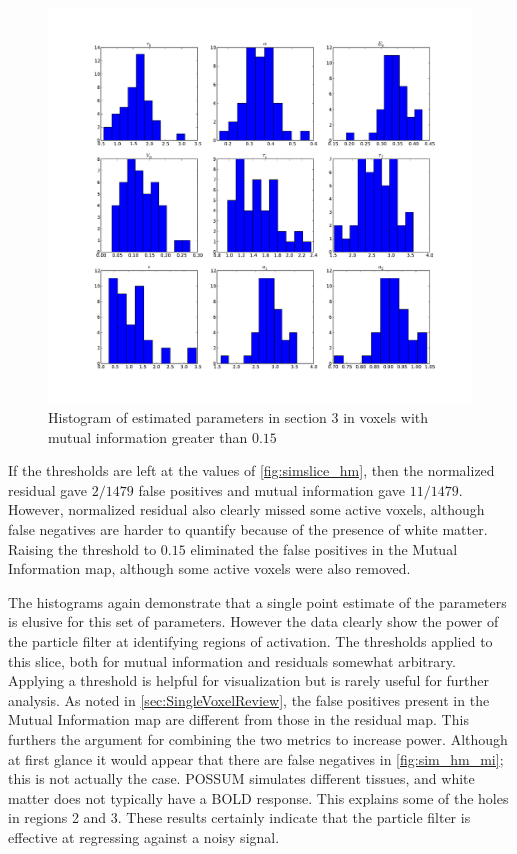 \begin{figure} %
\centering
\includegraphics[clip=true,trim=2.5cm 2cm 2cm 1cm,width=15cm]{images/slicesim_hist3}
\caption{Histogram of estimated parameters in section 3 in voxels with mutual information greater
than $0.15$}
\label{fig:slicesim_hist3}
\end{figure}

If the thresholds are left at the values of \autoref{fig:simslice_hm}, then
the normalized residual gave $2/1479$  false positives and mutual information gave
$11/1479$. However, normalized residual also clearly missed some active voxels, although
false negatives are harder to quantify because of the presence of white matter.
Raising the threshold to $0.15$ eliminated the false positives in the
Mutual Information map, although some active voxels were also removed.

The histograms again demonstrate that a single point estimate of the parameters
is elusive for this set of parameters. However the data clearly show the power
of the particle filter at identifying regions of activation.
The thresholds applied to this slice, both for mutual information and
residuals somewhat arbitrary. Applying a
threshold is helpful for visualization but is rarely useful for further analysis.
As noted in \autoref{sec:SingleVoxelReview},
the false positives present in the Mutual Information
map are different from those in the residual map. This furthers the argument
for combining the two metrics to increase power. Although
at first glance it would appear that there are false negatives in
\autoref{fig:sim_hm_mi}; this is
not actually the case. POSSUM simulates different tissues, and white matter
does not typically  have a BOLD response. This explains some of the holes in regions
2 and 3. These results certainly indicate that the particle filter is effective
at regressing against a noisy signal.
